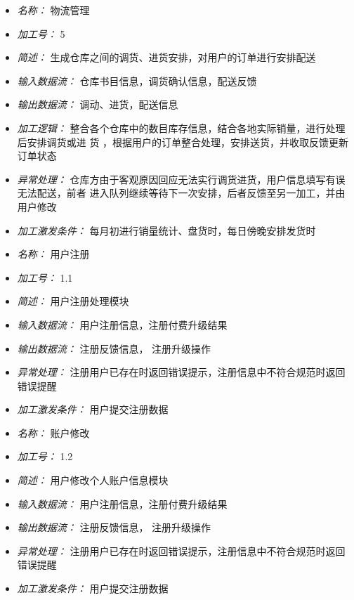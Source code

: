\begin{itemize}
\item \textit{名称： }物流管理
\item \textit{加工号： }5
\item \textit{简述： }生成仓库之间的调货、进货安排，对用户的订单进行安排配送
\item \textit{输入数据流： } 仓库书目信息，调货确认信息，配送反馈 
\item \textit{输出数据流： }调动、进货，配送信息 
\item \textit{加工逻辑： }整合各个仓库中的数目库存信息，结合各地实际销量，进行处理后安排调货或进 货 ，根据用户的订单整合处理，安排送货，并收取反馈更新订单状态 
\item \textit{异常处理： }仓库方由于客观原因回应无法实行调货进货，用户信息填写有误无法配送，前者 进入队列继续等待下一次安排，后者反馈至另一加工，并由用户修改 
\item \textit{加工激发条件： }每月初进行销量统计、盘货时，每日傍晚安排发货时

\end{itemize}


\vspace{-1mm}


\begin{itemize}
\item \textit{名称： } 用户注册
\item \textit{加工号： } 1.1
\item \textit{简述： } 用户注册处理模块
\item \textit{输入数据流： } 用户注册信息，注册付费升级结果
\item \textit{输出数据流： } 注册反馈信息， 注册升级操作
\item \textit{异常处理： } 注册用户已存在时返回错误提示，注册信息中不符合规范时返回错误提醒 
\item \textit{加工激发条件： } 用户提交注册数据

\end{itemize}


\vspace{-1mm}


\begin{itemize}
\item \textit{名称： } 账户修改
\item \textit{加工号： } 1.2
\item \textit{简述： } 用户修改个人账户信息模块
\item \textit{输入数据流： } 用户注册信息，注册付费升级结果
\item \textit{输出数据流： } 注册反馈信息， 注册升级操作
\item \textit{异常处理： } 注册用户已存在时返回错误提示，注册信息中不符合规范时返回错误提醒 
\item \textit{加工激发条件： } 用户提交注册数据

\end{itemize}


